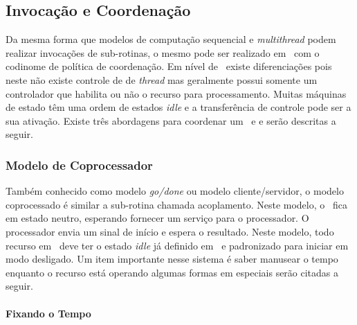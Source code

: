


\subsection{Invocação e Coordenação}

	Da mesma forma que modelos de computação sequencial e \textit{multithread} podem realizar invocações de sub-rotinas, o mesmo pode ser realizado em \hardware\ com o codinome de política de coordenação. Em nível de \hardware\ existe diferenciações pois neste não existe controle de de \textit{thread} mas geralmente possui somente um controlador que habilita ou não o recurso para processamento. Muitas máquinas de estado têm uma ordem de estados \textit{idle} e a transferência de controle pode ser a sua ativação. Existe três abordagens para coordenar um \hardware\ e \textit{\software} e serão descritas a seguir.


	\subsubsection{Modelo de Coprocessador}

		Também conhecido como modelo \textit{go/done} ou modelo cliente/servidor, o modelo coprocessado é similar a sub-rotina chamada acoplamento. Neste modelo, o \hardware\ fica em estado neutro, esperando fornecer um serviço para o processador. O processador envia um sinal de início e espera o resultado. Neste modelo, todo recurso em \hardware\ deve ter o estado \textit{idle} já definido em \design\ e padronizado para iniciar em modo desligado. Um item importante nesse sistema é saber manusear o tempo enquanto o recurso está operando algumas formas em especiais serão citadas a seguir.


		\paragraph{Fixando o Tempo}


